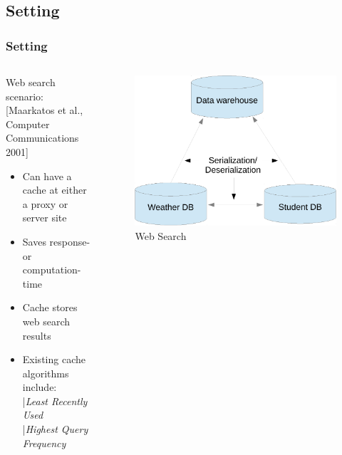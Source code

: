 \subsection{Setting}
\begin{frame}[red] %
\frametitle{Setting}
\begin{columns}
  \begin{column}{0.5\textwidth}
  Web search scenario: { \\ \tiny [Maarkatos et al., Computer Communications 2001]}
    \begin{itemize}
    \item Can have a cache at either a proxy or server site
    \item Saves response- or computation- time
    \item Cache stores web search results
    \item Existing cache algorithms include:\\ |{\it Least Recently Used} \\|{\it Highest Query Frequency}
    \end{itemize}
  \end{column}
  \begin{column}[t]{0.5\textwidth}
    \vspace{-2em}
    \begin{figure}
    \includegraphics[width=1.05\textwidth]{figures/placeholder.pdf} 
    \caption{Web Search}
    \end{figure}
  \end{column}
\end{columns}
\end{frame}


